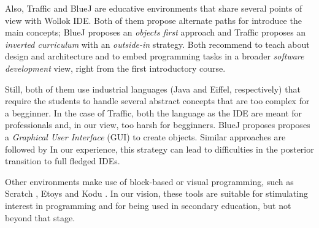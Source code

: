 Also, Traffic \cite{broy_outside-method_2003} and BlueJ \cite{bennedsen_bluej_2010} 
are educative environments that share several points of view with Wollok IDE.
Both of them propose alternate paths for introduce the main concepts;
BlueJ proposes an \emph{objects first} approach
and Traffic proposes an \emph{inverted curriculum} with an \emph{outside-in} strategy.
Both recommend to teach about design and architecture 
and to embed programming tasks in a broader \emph{software development} view, 
right from the first introductory course.

Still, both of them use industrial languages (Java and Eiffel, respectively) 
that require the students to handle several abstract concepts 
that are too complex for a begginner.
In the case of Traffic, both the language as the IDE are meant for professionals
and, in our view, too harsh for begginners.
BlueJ proposes proposes a \emph{Graphical User Interface} (GUI) to create objects.
Similar approaches are followed by 
In our experience, this strategy can lead to difficulties 
in the posterior transition to full fledged IDEs.

Other environments make use of block-based or visual programming, 
such as Scratch \cite{malan_scratch_2007}, Etoys \cite{lee_empowering_2011} and Kodu \cite{kodu}. 
In our vision, these tools are suitable for stimulating interest in programming and for being used in secondary education, but not beyond that stage.
